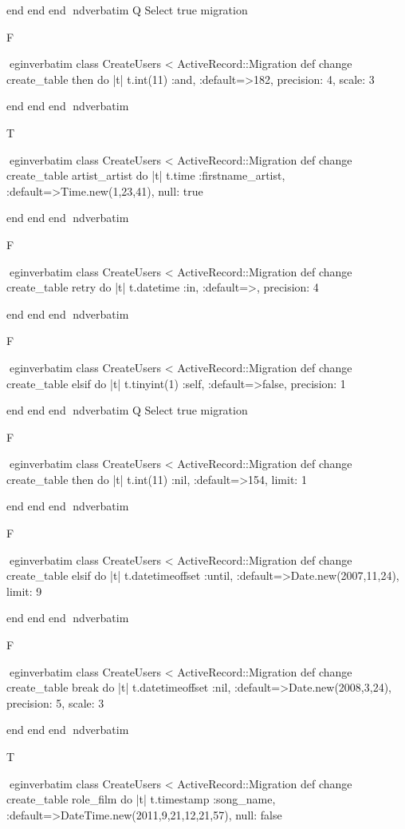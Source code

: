     end 
  end 
end
nd{verbatim}
Q
 Select true migration

F

egin{verbatim}
 class CreateUsers < ActiveRecord::Migration 
  def change 
    create_table then do |t| 
      t.int(11) :and, :default=>182, precision: 4, scale: 3
    
    end 
  end 
end
nd{verbatim}

T

egin{verbatim}
 class CreateUsers < ActiveRecord::Migration 
  def change 
    create_table artist_artist do |t| 
      t.time :firstname_artist, :default=>Time.new(1,23,41), null: true
    
    end 
  end 
end
nd{verbatim}

F

egin{verbatim}
 class CreateUsers < ActiveRecord::Migration 
  def change 
    create_table retry do |t| 
      t.datetime :in, :default=>, precision: 4
    
    end 
  end 
end
nd{verbatim}

F

egin{verbatim}
 class CreateUsers < ActiveRecord::Migration 
  def change 
    create_table elsif do |t| 
      t.tinyint(1) :self, :default=>false, precision: 1
    
    end 
  end 
end
nd{verbatim}
Q
 Select true migration

F

egin{verbatim}
 class CreateUsers < ActiveRecord::Migration 
  def change 
    create_table then do |t| 
      t.int(11) :nil, :default=>154, limit: 1
    
    end 
  end 
end
nd{verbatim}

F

egin{verbatim}
 class CreateUsers < ActiveRecord::Migration 
  def change 
    create_table elsif do |t| 
      t.datetimeoffset :until, :default=>Date.new(2007,11,24), limit: 9
    
    end 
  end 
end
nd{verbatim}

F

egin{verbatim}
 class CreateUsers < ActiveRecord::Migration 
  def change 
    create_table break do |t| 
      t.datetimeoffset :nil, :default=>Date.new(2008,3,24), precision: 5, scale: 3
    
    end 
  end 
end
nd{verbatim}

T

egin{verbatim}
 class CreateUsers < ActiveRecord::Migration 
  def change 
    create_table role_film do |t| 
      t.timestamp :song_name, :default=>DateTime.new(2011,9,21,12,21,57), null: false
    
